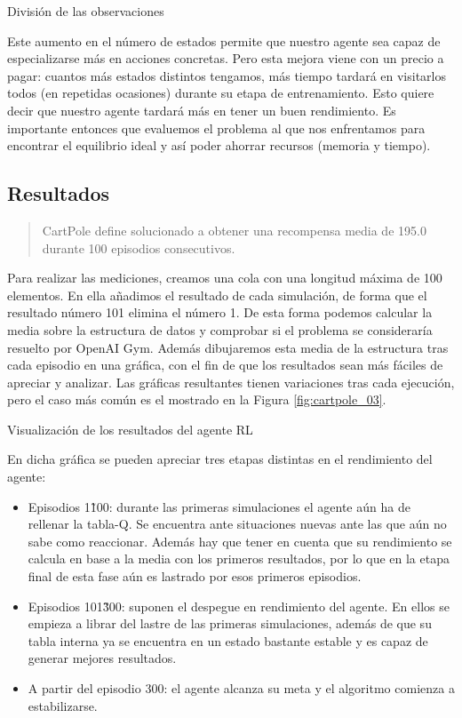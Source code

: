 %
       {División de las observaciones}

Este aumento en el número de estados permite que nuestro agente sea capaz de especializarse más en acciones concretas. Pero esta mejora viene con un precio a pagar: cuantos más estados distintos tengamos, más tiempo tardará en visitarlos todos (en repetidas ocasiones) durante su etapa de entrenamiento. Esto quiere decir que nuestro agente tardará más en tener un buen rendimiento. Es importante entonces que evaluemos el problema al que nos enfrentamos para encontrar el equilibrio ideal y así poder ahorrar recursos (memoria y tiempo).

\subsection{Resultados}
\begin{quote}
    CartPole define solucionado a obtener una recompensa media de 195.0 durante 100 episodios consecutivos.
\end{quote}

Para realizar las mediciones, creamos una cola con una longitud máxima de 100 elementos. En ella añadimos el resultado de cada simulación, de forma que el resultado número 101 elimina el número 1. De esta forma podemos calcular la media sobre la estructura de datos y comprobar si el problema se consideraría resuelto por OpenAI Gym. Además dibujaremos esta media de la estructura tras cada episodio en una gráfica, con el fin de que los resultados sean más fáciles de apreciar y analizar. Las gráficas resultantes tienen variaciones tras cada ejecución, pero el caso más común es el mostrado en la Figura \ref{fig:cartpole_03}.

%
       {Visualización de los resultados del agente RL}

En dicha gráfica se pueden apreciar tres etapas distintas en el rendimiento del agente:
\begin{itemize}
    \item Episodios 1\~100: durante las primeras simulaciones el agente aún ha de rellenar la tabla-Q. Se encuentra ante situaciones nuevas ante las que aún no sabe como reaccionar. Además hay que tener en cuenta que su rendimiento se calcula en base a la media con los primeros resultados, por lo que en la etapa final de esta fase aún es lastrado por esos primeros episodios.
    \item Episodios 101\~300: suponen el despegue en rendimiento del agente. En ellos se empieza a librar del lastre de las primeras simulaciones, además de que su tabla interna ya se encuentra en un estado bastante estable y es capaz de generar mejores resultados.
    \item A partir del episodio 300: el agente alcanza su meta y el algoritmo comienza a estabilizarse.
\end{itemize}

